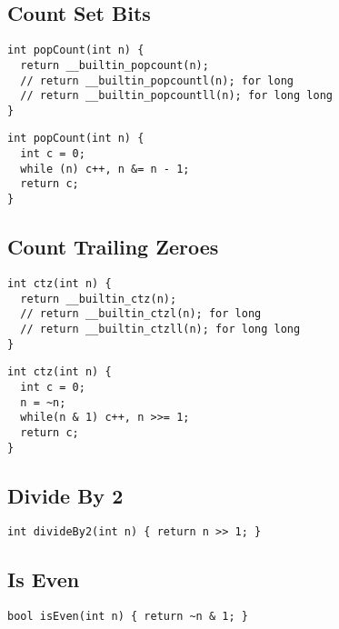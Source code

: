 \documentclass[twoside]{article}
\begin{document}
\begin{multicols*}{2}
\subsectionfont{\large\bfseries\sffamily\underline}
\subsection*{Count Set Bits}
\begin{verbatim}
int popCount(int n) {
  return __builtin_popcount(n);
  // return __builtin_popcountl(n); for long
  // return __builtin_popcountll(n); for long long
}
\end{verbatim}
\vspace{-12pt}
\begin{verbatim}
int popCount(int n) {
  int c = 0;
  while (n) c++, n &= n - 1;
  return c;
}
\end{verbatim}

\subsectionfont{\large\bfseries\sffamily\underline}
\subsection*{Count Trailing Zeroes}
\begin{verbatim}
int ctz(int n) {
  return __builtin_ctz(n);
  // return __builtin_ctzl(n); for long
  // return __builtin_ctzll(n); for long long
}
\end{verbatim}
\vspace{-12pt}
\begin{verbatim}
int ctz(int n) {
  int c = 0;
  n = ~n;
  while(n & 1) c++, n >>= 1;
  return c;
}
\end{verbatim}

\subsectionfont{\large\bfseries\sffamily\underline}
\subsection*{Divide By 2}
\begin{verbatim}
int divideBy2(int n) { return n >> 1; }
\end{verbatim}

\subsectionfont{\large\bfseries\sffamily\underline}
\subsection*{Is Even}
\begin{verbatim}
bool isEven(int n) { return ~n & 1; }
\end{verbatim}


\end{multicols*}
\end{document}
